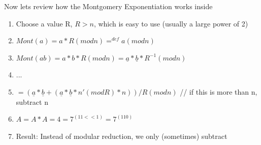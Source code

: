 Now lets review how the Montgomery Exponentiation works inside
\begin{enumerate}
	\item  Choose a value R, \(R>n\), which is easy to use (usually a large power of 2)
	\item  \(Mont(a)=a*R(mod n) =^{def}  a(mod n)\)
	\item  \(Mont(ab)=a*b*R(mod n)=\underline{a}*\underline{b}*R^{-1} (mod n)\)
	\item  \(... \)
	\item  \( = (\underline{a}*\underline{b} + (\underline{a}*\underline{b}*n'(mod R)*n))/R(modn) \) \newline
	// if this is more than n, subtract n
	\item  \( A = A*A = 4 = 7^{(11<<1)} = 7^{(110)} \)
	\item  Result: Instead of modular reduction, we only (sometimes) subtract
\end{enumerate}

